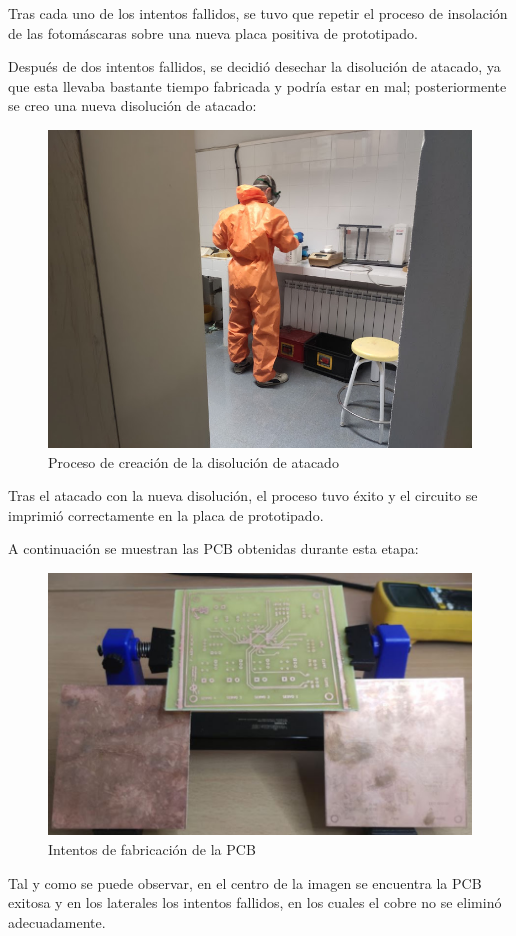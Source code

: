 \begin{itemize}
    Tras cada uno de los intentos fallidos, se tuvo que repetir el proceso de insolación de las fotomáscaras sobre una nueva placa positiva de prototipado.
    
    Después de dos intentos fallidos, se decidió desechar la disolución de atacado, ya que esta llevaba bastante tiempo fabricada y podría estar en mal; posteriormente se creo una nueva disolución de atacado:
    
    \begin{figure}[H]
    \centering 
    \includegraphics[width=0.65\linewidth]{pictures/BreakingBad.jpg}
    \caption{Proceso de creación de la disolución de atacado}
    \label{fig:kdiagram}
    \end{figure}
    
    Tras el atacado con la nueva disolución, el proceso tuvo éxito y el circuito se imprimió correctamente en la placa de prototipado.
    
    A continuación se muestran las \ac{PCB} obtenidas durante esta etapa:
    
    \begin{figure}[H]
    \centering 
    \includegraphics[width=0.65\linewidth]{pictures/CursedPodium.jpg}
    \caption{Intentos de fabricación de la \ac{PCB}}
    \label{fig:kdiagram}
    \end{figure}
    
    Tal y como se puede observar, en el centro de la imagen se encuentra la \ac{PCB} exitosa y en los laterales los intentos fallidos, en los cuales el cobre no se eliminó adecuadamente.
    

\end{itemize}
